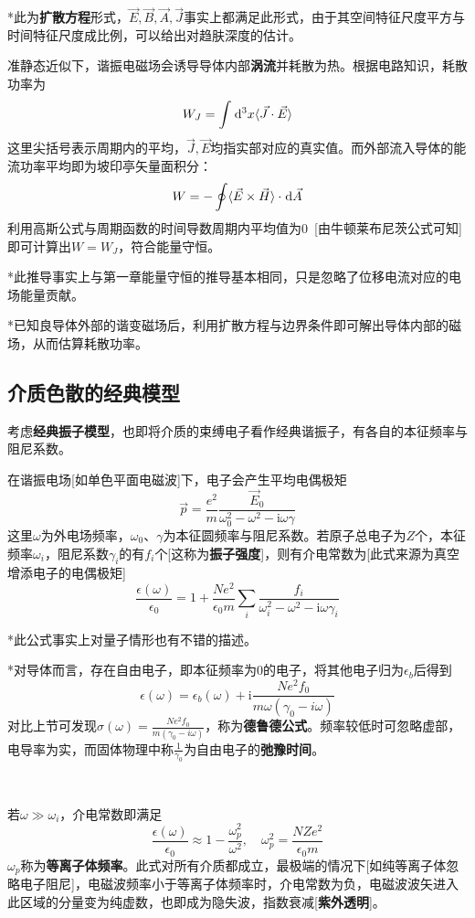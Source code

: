 \documentclass[a4paper,UTF8,fontset=windows]{ctexart}
\newcommand*{\dr}{\hspace{0.07em}\mathrm{d}}
\newcommand*{\ir}{\mathrm{i}}
\newcommand*{\va}{\vec{A}}
\newcommand*{\vb}{\vec{B}}
\newcommand*{\ve}{\vec{E}}
\newcommand*{\vh}{\vec{H}}
\newcommand*{\vj}{\vec{J}}
\newcommand*{\vps}{\vec{p}}
\begin{document}
*此为\textbf{扩散方程}形式，$\ve,\vb,\va,\vj$事实上都满足此形式，由于其空间特征尺度平方与时间特征尺度成比例，可以给出对趋肤深度的估计。

准静态近似下，谐振电磁场会诱导导体内部\textbf{涡流}并耗散为热。根据电路知识，耗散功率为
$$W_J=\int\dr^3x\langle\vj\cdot\ve\rangle$$
这里尖括号表示周期内的平均，$\vj,\ve$均指实部对应的真实值。而外部流入导体的能流功率平均即为坡印亭矢量面积分：
$$W=-\oint\langle\ve\times\vh\rangle\cdot\dr\va$$
利用高斯公式与周期函数的时间导数周期内平均值为0\ [由牛顿莱布尼茨公式可知]即可计算出$W=W_J$，符合能量守恒。

*此推导事实上与第一章能量守恒的推导基本相同，只是忽略了位移电流对应的电场能量贡献。

*已知良导体外部的谐变磁场后，利用扩散方程与边界条件即可解出导体内部的磁场，从而估算耗散功率。

\subsection{介质色散的经典模型}
考虑\textbf{经典振子模型}，也即将介质的束缚电子看作经典谐振子，有各自的本征频率与阻尼系数。

在谐振电场[如单色平面电磁波]下，电子会产生平均电偶极矩
$$\vps=\frac{e^2}{m}\frac{\ve_0}{\omega_0^2-\omega^2-\ir\omega\gamma}$$
这里$\omega$为外电场频率，$\omega_0$、$\gamma$为本征圆频率与阻尼系数。若原子总电子为$Z$个，本征频率$\omega_i$，阻尼系数$\gamma_i$的有$f_i$个[这称为\textbf{振子强度}]，则有介电常数为[此式来源为真空增添电子的电偶极矩]
$$\frac{\epsilon(\omega)}{\epsilon_0}=1+\frac{Ne^2}{\epsilon_0m}\sum_i\frac{f_i}{\omega_i^2-\omega^2-\ir\omega\gamma_i}$$

*此公式事实上对量子情形也有不错的描述。

*对导体而言，存在自由电子，即本征频率为0的电子，将其他电子归为$\epsilon_b$后得到
$$\epsilon(\omega)=\epsilon_b(\omega)+\ir\frac{Ne^2f_0}{m\omega(\gamma_0-i\omega)}$$
对比上节可发现$\sigma(\omega)=\frac{Ne^2f_0}{m(\gamma_0-i\omega)}$，称为\textbf{德鲁德公式}。频率较低时可忽略虚部，电导率为实，而固体物理中称$\frac{1}{\gamma_0}$为自由电子的\textbf{弛豫时间}。

\

若$\omega\gg\omega_i$，介电常数即满足
$$\frac{\epsilon(\omega)}{\epsilon_0}\approx1-\frac{\omega_p^2}{\omega^2},\quad\omega_p^2=\frac{NZe^2}{\epsilon_0m}$$
$\omega_p$称为\textbf{等离子体频率}。此式对所有介质都成立，最极端的情况下[如纯等离子体忽略电子阻尼]，电磁波频率小于等离子体频率时，介电常数为负，电磁波波矢进入此区域的分量变为纯虚数，也即成为隐失波，指数衰减[\textbf{紫外透明}]。
\end{document}
